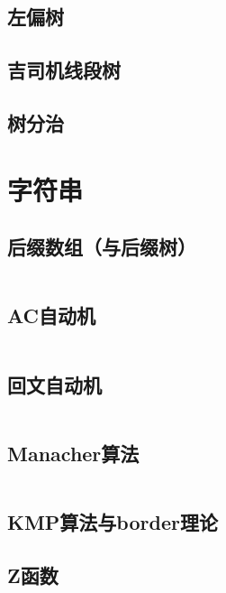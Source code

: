 \documentclass[12pt, a4paper, oneside]{ctexart}
\begin{document}
\begin{multicols}{2}
        \subsection{左偏树}
        
        \subsection{吉司机线段树}
        
        \subsection{树分治}
        

        
        \section{字符串}
        \subsection{后缀数组（与后缀树）}
        \inputminted{cpp}{src/string/SA.cpp}
        \subsection{AC自动机}
        \inputminted{cpp}{src/string/ACAM.cpp}
        \subsection{回文自动机}
        \inputminted{cpp}{src/string/PAM.cpp}
        \subsection{Manacher算法}
        \inputminted{cpp}{src/string/manacher.cpp}
        \subsection{KMP算法与border理论}
        
        \subsection{Z函数}
        

\end{multicols}
\end{document}
